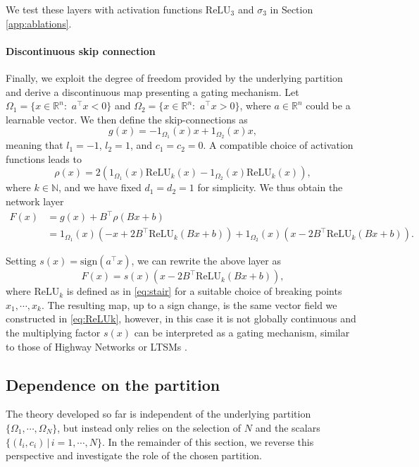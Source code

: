 \documentclass{article}
\newcommand{\R}{\mathbb{R}}
\theoremstyle{plain}
\theoremstyle{definition}
\theoremstyle{definition}
\theoremstyle{remark}
\theoremstyle{definition}
\theoremstyle{definition}
\theoremstyle{remark}
\numberwithin{equation}{section}
\begin{document}
We test these layers with activation functions $\mathrm{ReLU}_3$ and $\sigma_3$ in Section \ref{app:ablations}.

\paragraph{Discontinuous skip connection} Finally, we exploit the degree of freedom provided by the underlying partition and derive a discontinuous map presenting a gating mechanism. Let $\Omega_1 = \{x\in\R^n:\,\,a^\top x < 0\}$ and $\Omega_2 = \{x\in\R^n:\,\,a^\top x > 0\}$, where $a\in\R^n$ could be a learnable vector. We then define the skip-connections as
\[
g(x) = -1_{\Omega_1}(x) x + 1_{\Omega_2}(x) x,
\]
meaning that $l_1 = -1$, $l_2=1$, and $c_1=c_2=0$. A compatible choice of activation functions leads to
\[
\rho(x) = 2(1_{\Omega_1}(x) \mathrm{ReLU}_k(x) - 1_{\Omega_2}(x) \mathrm{ReLU}_k(x)),
\]
where $k\in\mathbb{N}$, and we have fixed $d_1=d_2=1$ for simplicity. We thus obtain the network layer
\begin{align*}
F(x) & = g(x)+B^\top \rho(Bx+b)\\
& = 1_{\Omega_1}(x) \left(-x + 2B^\top\mathrm{ReLU}_k(Bx+b)\right)+ 1_{\Omega_2}(x) \left(x - 2B^\top\mathrm{ReLU}_k(Bx+b)\right).
\end{align*}

Setting $s(x)=\mathrm{sign}(a^\top x)$, we can rewrite the above layer as 
\[
F(x) = s(x) (x - 2 B^\top \mathrm{ReLU}_k(Bx+b)),
\]
where $\mathrm{ReLU}_k$ is defined as in \eqref{eq:stair} for a suitable choice of breaking points $x_1,\cdots,x_k$. The resulting map, up to a sign change, is the same vector field we constructed in \eqref{eq:ReLUk}, however, in this case it is not globally continuous and the multiplying factor $s(x)$ can be interpreted as a gating mechanism, similar to those of Highway Networks \cite{srivastava2015highway} or LTSMs \cite{hochreiter1997long}.

\subsection{Dependence on the partition} The theory developed so far is independent of the underlying partition $\{\Omega_1, \cdots, \Omega_N\}$, but instead only relies on the selection of $N$ and the scalars $\{(l_i,c_i)\,|\,i=1,\cdots,N\}$. In the remainder of this section, we reverse this perspective and investigate the role of the chosen partition.
\end{document}
